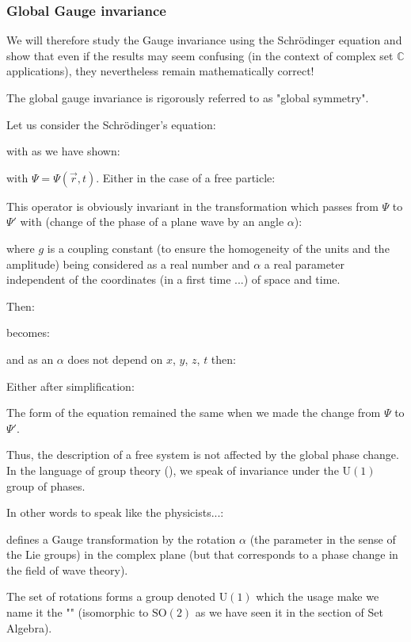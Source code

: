 	\subsubsection{Global Gauge invariance}
	We will therefore study the Gauge invariance using the Schrödinger equation and show that even if the results may seem confusing (in the context of complex set $\mathbb{C}$ applications), they nevertheless remain mathematically correct!
	\begin{tcolorbox}[title=Remark,colframe=black,arc=10pt]
	The global gauge invariance is rigorously referred to as "global symmetry".
	\end{tcolorbox}
	Let us consider the Schrödinger's equation:
	
	with as we have shown:
	
	with $\Psi=\Psi(\vec{r},t)$. Either in the case of a free particle:
	
	This operator is obviously invariant in the transformation which passes from $\Psi$ to $\Psi'$ with (change of the phase of a plane wave by an angle $\alpha$):
	
	where $g$ is a coupling constant (to ensure the homogeneity of the units and the amplitude) being considered as a real number and $\alpha$ a real parameter independent of the coordinates (in a first time ...) of space and time.
	
	Then:
	
	becomes:
	
	and as an $\alpha$ does not depend on $x$, $y$, $z$, $t$ then:
	
	Either after simplification:
	
	The form of the equation remained the same when we made the change from $\Psi$ to $\Psi'$.
	
	Thus, the description of a free system is not affected by the global phase change. In the language of group theory (), we speak of invariance under the $\text{U}(1)$ group of  phases.

	In other words to speak like the physicists...:
	
	defines a Gauge transformation by the rotation $\alpha$ (the parameter in the sense of the Lie groups) in the complex plane (but that corresponds to a phase change in the field of wave theory).
	
	The set of rotations forms a group denoted $\text{U}(1)$ which the usage make we name it the "" (isomorphic to $\text{SO}(2)$ as we have seen it in the section of Set Algebra).
	
